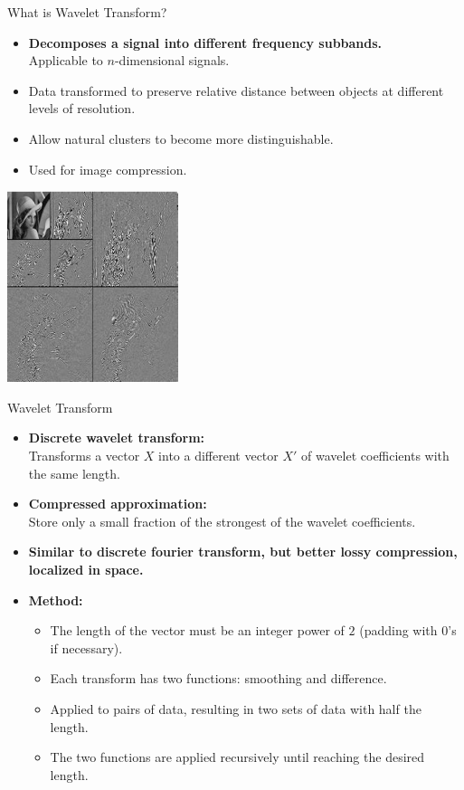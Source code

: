 \begin{frame}{What is Wavelet Transform?}
	\begin{minipage}[b]{0.55\textwidth}
		\begin{itemize}
			\item \textbf{Decomposes a signal into different frequency 
			subbands.}\\
			Applicable to $n$-dimensional signals.
			\item Data transformed to preserve relative distance between 
			objects at different levels of resolution.
			\item Allow natural clusters to become more distinguishable.
			\item Used for image compression.
		\end{itemize}
	\end{minipage}\hspace{1cm}
	\begin{minipage}[b]{0.30\textwidth}
		\includegraphics[width=5cm]{img/wavelettransform.png}
	\end{minipage}
\end{frame}

\begin{frame}{Wavelet Transform}
	\begin{itemize}
		\item \textbf{Discrete wavelet transform:}\\
		Transforms a vector $X$ into a different vector $X'$ of wavelet 
		coefficients with the same length.
		\item \textbf{Compressed approximation:}\\
		Store only a small fraction of the strongest of the wavelet 
		coefficients.
		\item \textbf{Similar to discrete fourier transform, but better lossy 
		compression, localized in space.}
		\item \textbf{Method:}
		\begin{itemize}
			\item The length of the vector must be an integer power of $2$ 
			(padding with $0$'s if necessary).
			\item Each transform has two functions: smoothing and difference.
			\item Applied to pairs of data, resulting in two sets of data with 
			half the length.
			\item The two functions are applied recursively until reaching the 
			desired length.
		\end{itemize}
	\end{itemize}
\end{frame}

